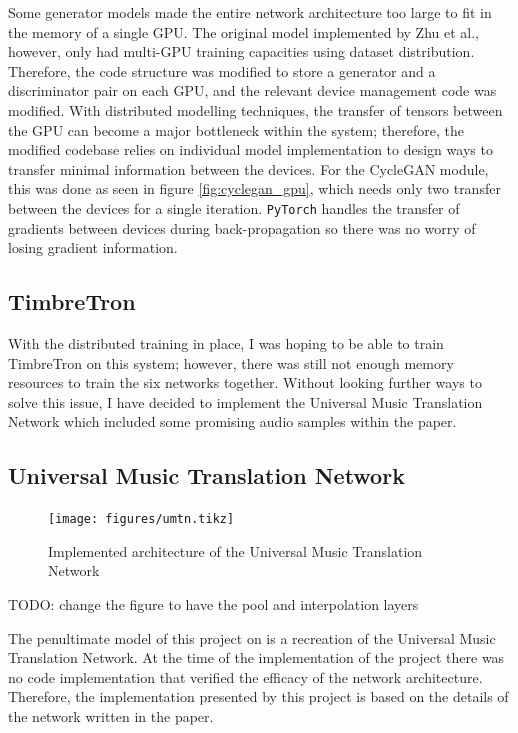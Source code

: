 \documentclass[12pt,a4paper,]{report}
\begin{document}
Some generator models made the entire network architecture too large to
fit in the memory of a single GPU. The original model implemented by Zhu
et al., however, only had multi-GPU training capacities using dataset
distribution. Therefore, the code structure was modified to store a
generator and a discriminator pair on each GPU, and the relevant device
management code was modified. With distributed modelling techniques, the
transfer of tensors between the GPU can become a major bottleneck within
the system; therefore, the modified codebase relies on individual model
implementation to design ways to transfer minimal information between
the devices. For the CycleGAN module, this was done as seen in figure
\ref{fig:cyclegan_gpu}, which needs only two transfer between the
devices for a single iteration. \texttt{PyTorch} handles the transfer of
gradients between devices during back-propagation so there was no worry
of losing gradient information.

\hypertarget{timbretron-1}{%
\subsection{TimbreTron}\label{timbretron-1}}

With the distributed training in place, I was hoping to be able to train
TimbreTron on this system; however, there was still not enough memory
resources to train the six networks together. Without looking further
ways to solve this issue, I have decided to implement the Universal
Music Translation Network which included some promising audio samples
within the paper.

\hypertarget{universal-music-translation-network-1}{%
\subsection{Universal Music Translation
Network}\label{universal-music-translation-network-1}}

\begin{figure}[h]
    \texttt{[image: figures/umtn.tikz]}
\centering 
\caption{Implemented architecture of the Universal Music Translation Network \label{fig:umtn}}
\end{figure}

TODO: change the figure to have the pool and interpolation layers

The penultimate model of this project on is a recreation of the
Universal Music Translation Network. At the time of the implementation
of the project there was no code implementation that verified the
efficacy of the network architecture. Therefore, the implementation
presented by this project is based on the details of the network written
in the paper.
\end{document}
